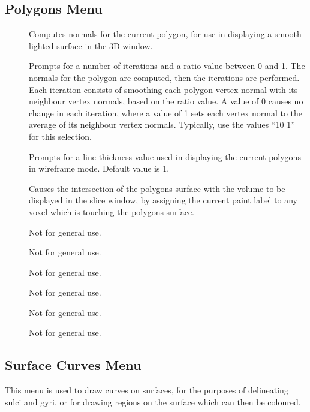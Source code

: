 \subsection{Polygons Menu}

\begin{description}
\item[]  Computes normals for the
     current polygon, for use in displaying a smooth lighted surface in
     the 3D window. 
\item[]  Prompts for a number of
     iterations and a ratio value between 0 and 1.  The normals for the
     polygon are computed, then the iterations are performed.  Each
     iteration consists of smoothing each polygon vertex normal with
     its neighbour vertex normals, based on the ratio value.  A value
     of 0 causes no change in each iteration, where a value of 1
     sets each vertex normal to the average of its neighbour vertex
     normals.  Typically, use the values ``10 1'' for this selection.
\item[]  Prompts for a line thickness
     value used in displaying the current polygons in wireframe mode.
     Default value is 1.
\item[]  Causes the intersection
     of the polygons surface with the volume to be displayed in the
     slice window, by assigning the current paint label to any voxel
     which is touching the polygons surface.
\item[]  Not for general use.
\item[]  Not for general use.
\item[]  Not for general use.
\item[]  Not for general use.
\item[]  Not for general use.
\item[]  Not for general use.
\end{description}

\subsection{Surface Curves Menu}

This menu is used to draw curves on surfaces, for the purposes of
delineating sulci and gyri, or for drawing regions on the surface which
can then be coloured.

